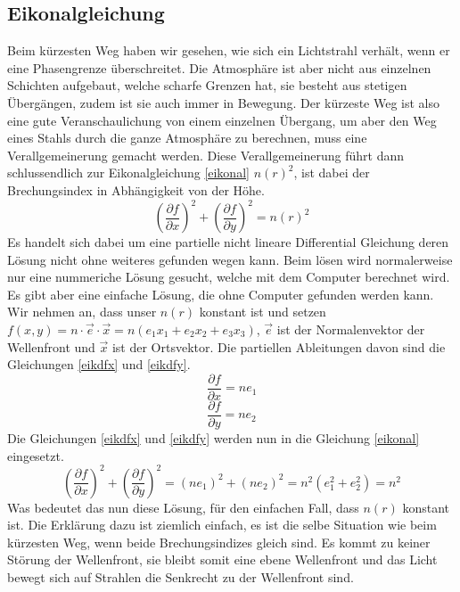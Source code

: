 \begin{refsection}
\section{Eikonalgleichung}
Beim kürzesten Weg haben wir gesehen, wie sich ein Lichtstrahl verhält, wenn er eine Phasengrenze überschreitet. Die Atmosphäre ist aber nicht aus einzelnen Schichten aufgebaut, welche scharfe Grenzen hat, sie besteht aus stetigen Übergängen, zudem ist sie auch immer in Bewegung. Der kürzeste Weg ist also eine gute Veranschaulichung von einem einzelnen Übergang, um aber den Weg eines Stahls durch die ganze Atmosphäre zu berechnen, muss eine Verallgemeinerung gemacht werden. Diese Verallgemeinerung führt dann schlussendlich zur Eikonalgleichung \eqref{eikonal} $n(r)^{2}$, ist dabei der Brechungsindex in Abhängigkeit von der Höhe. 
\begin{equation}\label{eikonal}
\left( \dfrac{\partial f}{\partial x}\right)^{2} + \left( \dfrac{\partial f}{\partial y}\right) ^{2} = n(r)^{2}
\end{equation}
Es handelt sich dabei um eine partielle nicht lineare Differential Gleichung deren Lösung nicht ohne weiteres gefunden wegen kann. Beim lösen wird normalerweise nur eine nummeriche Lösung gesucht, welche mit dem Computer berechnet wird. Es gibt aber eine einfache Lösung, die ohne Computer gefunden werden kann. Wir nehmen an, dass unser $n(r)$ konstant ist und setzen $f(x,y)=n\cdot\vec{e}\cdot\vec{x}= n(e_{1}x_{1}+e_{2}x_{2}+e_{3}x_{3})$, $\vec{e}$ ist der Normalenvektor der Wellenfront und $\vec{x}$ ist der Ortsvektor. Die partiellen Ableitungen davon sind die Gleichungen \eqref{eikdfx} und \eqref{eikdfy}.
\begin{equation}\label{eikdfx}
\dfrac{\partial f}{\partial x} = ne_{1}
\end{equation}
\begin{equation}\label{eikdfy}
\dfrac{\partial f}{\partial y} = ne_{2}
\end{equation}
Die Gleichungen \eqref{eikdfx} und \eqref{eikdfy} werden nun in die Gleichung \eqref{eikonal} eingesetzt.
\begin{equation}\label{lösung_eik}
\left( \dfrac{\partial f}{\partial x}\right)^{2} + \left( \dfrac{\partial f}{\partial y}\right) ^{2} = \left( ne_{1}\right) ^{2}+\left( ne_{2}\right)^{2}=n^{2}(e_{1}^{2}+e_{2}^{2})=n^{2}
\end{equation}
Was bedeutet das nun diese Lösung, für den einfachen Fall, dass $n(r)$ konstant ist. Die Erklärung dazu ist ziemlich einfach, es ist die selbe Situation wie beim kürzesten Weg, wenn beide Brechungsindizes gleich sind. Es kommt zu keiner Störung der Wellenfront, sie bleibt somit eine ebene Wellenfront und das Licht bewegt sich auf Strahlen die Senkrecht zu der Wellenfront sind.


\end{refsection}
